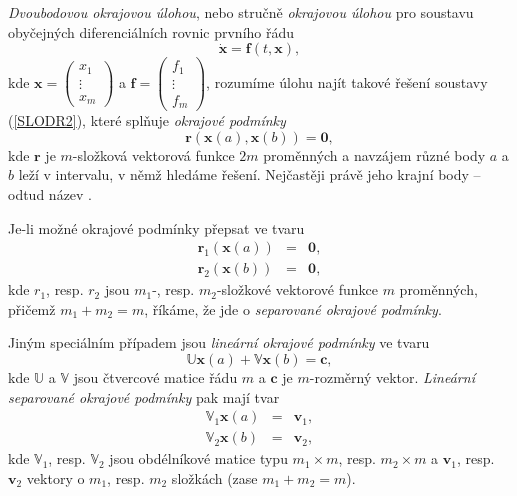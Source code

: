 \documentclass[a4paper, 12pt]{book}
\theoremstyle{definition}
\def\vc#1{\mathbf{\boldsymbol{#1}}}     %
\def\tn#1{{\mathbb{#1}}}    %
\begin{document}
{\em Dvoubodovou okrajovou úlohou}, nebo stručně {\em okrajovou úlohou} pro 
soustavu obyčejných diferenciálních rovnic prvního řádu
\begin{equation}\label{SLODR2}
\dot {\vc x}=\vc f(t,\vc x),
\end{equation}
kde $\vc x=\left(\begin{array}{c}x_1\\ \vdots\\x_m\end{array}\right)$ a 
$\vc f=\left(\begin{array}{c}f_1\\ \vdots\\f_m\end{array}\right)$,
rozumíme úlohu najít takové řešení soustavy (\ref{SLODR2}), které
splňuje {\em okrajové podmínky}
\begin{equation}\label{okp}
\vc r(\vc x(a),\vc x(b))=\vc 0,
\end{equation}
kde $\vc r$ je $m$-složková vektorová funkce $2m$ proměnných a navzájem různé 
body $a$ a $b$ leží v intervalu, v němž hledáme řešení. Nejčastěji právě jeho
krajní body -- odtud název .

Je-li možné okrajové podmínky přepsat ve tvaru
\begin{equation}\label{sepokp}
\begin{array}{rcl}
\vc r_1(\vc x(a))&=&\vc 0,\\
\vc r_2(\vc x(b))&=&\vc 0,
\end{array}
\end{equation}
kde $r_1$, resp. $r_2$ jsou $m_1$-, resp. $m_2$-složkové vektorové funkce $m$
proměnných, přičemž $m_1+m_2=m$, říkáme, že jde o {\em separované okrajové 
podmínky}.

Jiným speciálním případem jsou {\em lineární okrajové podmínky} ve tvaru
\begin{equation}\label{linokp}
{\tn U}\vc x(a)+ {\tn V}\vc x(b)=\vc c,
\end{equation}
kde $\tn U$ a $\tn V$ jsou čtvercové matice řádu $m$ a $\vc c$ je $m$-rozměrný
vektor. {\em Lineární separované okrajové podmínky} pak mají tvar
\begin{equation}\label{linsepokp}
\begin{array}{rcl}
{\tn V}_1 \vc x(a)&=&\vc v_1,\\
{\tn V}_2 \vc x(b)&=&\vc v_2,
\end{array}
\end{equation}
kde ${\tn V}_1$, resp. ${\tn V}_2$ jsou obdélníkové matice typu $m_1\times m$, 
resp. $m_2\times m$ a $\vc v_1$, resp. $\vc v_2$ vektory o $m_1$, resp. $m_2$
složkách (zase $m_1+m_2=m$).
\end{document}
